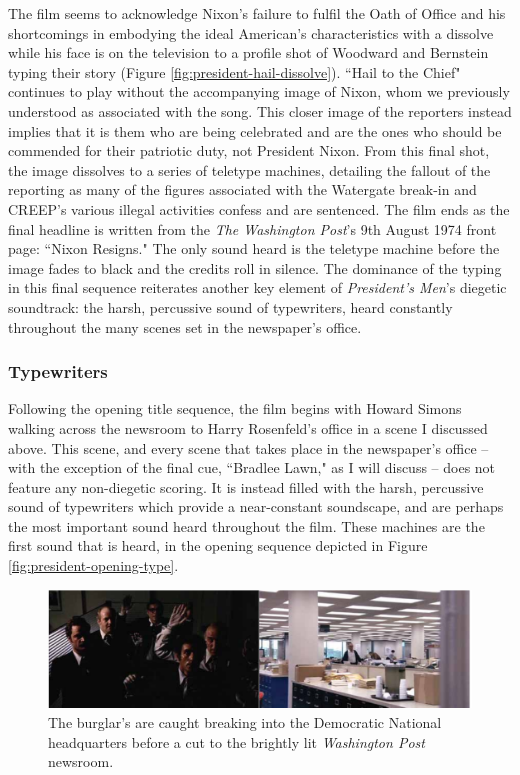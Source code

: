 The film seems to acknowledge Nixon's failure to fulfil the Oath of Office and his shortcomings in embodying the ideal American's characteristics with a dissolve while his face is on the television to a profile shot of Woodward and Bernstein typing their story (Figure \ref{fig:president-hail-dissolve}).
``Hail to the Chief" continues to play without the accompanying image of Nixon, whom we previously understood as associated with the song.
This closer image of the reporters instead implies that it is them who are being celebrated and are the ones who should be commended for their patriotic duty, not President Nixon.
From this final shot, the image dissolves to a series of teletype machines, detailing the fallout of the reporting as many of the figures associated with the Watergate break-in and CREEP's various illegal activities confess and are sentenced.
The film ends as the final headline is written from the \textit{The Washington Post}'s 9th August 1974 front page:
``Nixon Resigns."
The only sound heard is the teletype machine before the image fades to black and the credits roll in silence.
The dominance of the typing in this final sequence reiterates another key element of \textit{President's Men}'s diegetic soundtrack: the harsh, percussive sound of typewriters, heard constantly throughout the many scenes set in the newspaper's office. 


\subsubsection{Typewriters}

Following the opening title sequence, the film begins with Howard Simons walking across the newsroom to Harry Rosenfeld's office in a scene I discussed above.
This scene, and every scene that takes place in the newspaper's office – with the exception of the final cue, ``Bradlee Lawn," as I will discuss – does not feature any non-diegetic scoring.
It is instead filled with the harsh, percussive sound of typewriters which provide a near-constant soundscape, and are perhaps the most important sound heard throughout the film.
These machines are the first sound that is heard, in the opening sequence depicted in Figure \ref{fig:president-opening-type}.
\begin{figure}
    \centering
    \includegraphics[width=1\linewidth]{img/president-burglar-cut.pdf}
    \caption{The burglar's are caught breaking into the Democratic National headquarters before a cut to the brightly lit \textit{Washington Post} newsroom.}
    \label{fig:president-burglar-cut}
\end{figure}

